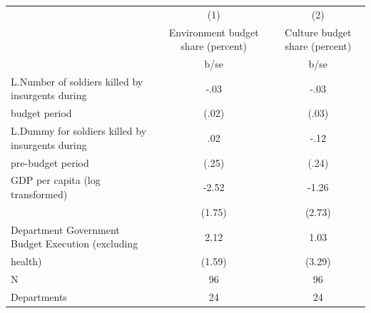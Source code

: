 {
\def\sym#1{\ifmmode^{#1}\else\(^{#1}\)\fi}
\begin{tabular}{l*{2}{c}}
\hline\hline
                                                  &\multicolumn{1}{c}{(1)}&\multicolumn{1}{c}{(2)}\\
                                                  &\multicolumn{1}{c}{Environment budget share (percent)}&\multicolumn{1}{c}{Culture budget share (percent)}\\
                                                  &        b/se   &        b/se   \\
\hline
L.Number of soldiers killed by insurgents during  &        -.03   &        -.03   \\
budget period                                     &       (.02)   &       (.03)   \\
L.Dummy for soldiers killed by insurgents during  &         .02   &        -.12   \\
pre-budget period                                 &       (.25)   &       (.24)   \\
GDP per capita (log transformed)                  &       -2.52   &       -1.26   \\
                                                  &      (1.75)   &      (2.73)   \\
Department Government Budget Execution (excluding &        2.12   &        1.03   \\
health)                                           &      (1.59)   &      (3.29)   \\
\hline
N                                                 &          96   &          96   \\
Departments                                       &          24   &          24   \\
\hline\hline
\end{tabular}
}
